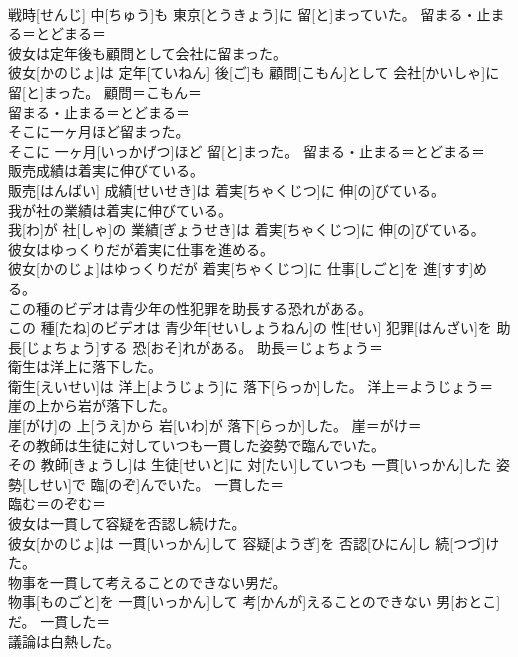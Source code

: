 \documentclass[8pt]{extreport}
\begin{document}
\begin{CJK}{UTF8}{min}
\\	戦時[せんじ] 中[ちゅう]も 東京[とうきょう]に 留[と]まっていた。	留まる・止まる＝とどまる＝ 
\\	彼女は定年後も顧問として会社に留まった。	
\\	彼女[かのじょ]は 定年[ていねん] 後[ご]も 顧問[こもん]として 会社[かいしゃ]に 留[と]まった。	顧問＝こもん＝ 
\\	留まる・止まる＝とどまる＝ 
\\	そこに一ヶ月ほど留まった。	
\\	そこに 一ヶ月[いっかげつ]ほど 留[と]まった。	留まる・止まる＝とどまる＝ 
\\	販売成績は着実に伸びている。	
\\	販売[はんばい] 成績[せいせき]は 着実[ちゃくじつ]に 伸[の]びている。	
\\	我が社の業績は着実に伸びている。	
\\	我[わ]が 社[しゃ]の 業績[ぎょうせき]は 着実[ちゃくじつ]に 伸[の]びている。	
\\	彼女はゆっくりだが着実に仕事を進める。	
\\	彼女[かのじょ]はゆっくりだが 着実[ちゃくじつ]に 仕事[しごと]を 進[すす]める。	
\\	この種のビデオは青少年の性犯罪を助長する恐れがある。	
\\	この 種[たね]のビデオは 青少年[せいしょうねん]の 性[せい] 犯罪[はんざい]を 助長[じょちょう]する 恐[おそ]れがある。	助長＝じょちょう＝ 
\\	衛生は洋上に落下した。	
\\	衛生[えいせい]は 洋上[ようじょう]に 落下[らっか]した。	洋上＝ようじょう＝ 
\\	崖の上から岩が落下した。	
\\	崖[がけ]の 上[うえ]から 岩[いわ]が 落下[らっか]した。	崖＝がけ＝ 
\\	その教師は生徒に対していつも一貫した姿勢で臨んでいた。	
\\	その 教師[きょうし]は 生徒[せいと]に 対[たい]していつも 一貫[いっかん]した 姿勢[しせい]で 臨[のぞ]んでいた。	一貫した＝ 
\\	臨む＝のぞむ＝ 
\\	彼女は一貫して容疑を否認し続けた。	
\\	彼女[かのじょ]は 一貫[いっかん]して 容疑[ようぎ]を 否認[ひにん]し 続[つづ]けた。	
\\	物事を一貫して考えることのできない男だ。	
\\	物事[ものごと]を 一貫[いっかん]して 考[かんが]えることのできない 男[おとこ]だ。	一貫した＝ 
\\	議論は白熱した。	

\end{CJK}
\end{document}
